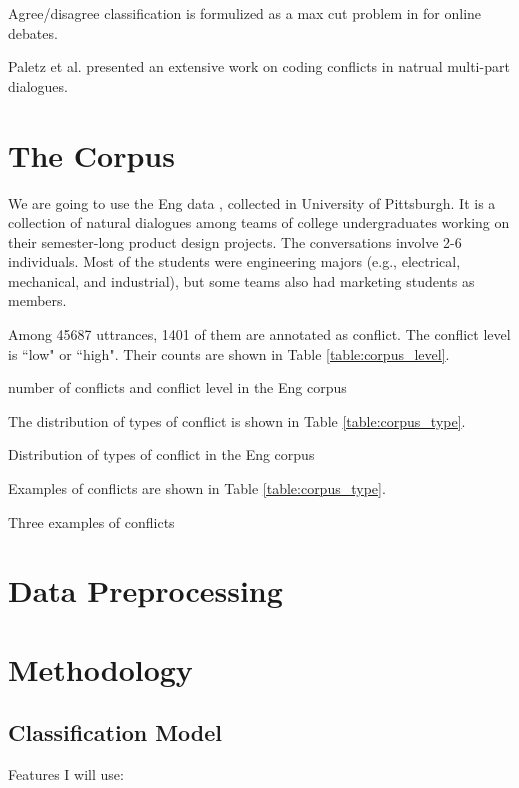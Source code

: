 \documentclass[11pt,letterpaper]{article}
\begin{document}
Agree/disagree classification is formulized as a max cut problem in \cite{Murakami:2010} for online debates.

Paletz et al.  presented an extensive work on coding conflicts in natrual multi-part dialogues.

\section{The Corpus}
We are going to use the Eng data \cite{Jang:2012,Friedberg:2012}, collected in University of Pittsburgh.
It is a collection of natural dialogues among teams of college undergraduates working on their semester-long product design projects.
The conversations involve 2-6 individuals. Most of the students were engineering majors (e.g., electrical, mechanical, and industrial), but some teams also had marketing students as members.

Among 45687 uttrances, 1401 of them are annotated as conflict. The conflict level is ``low" or ``high". Their counts are shown in Table \ref{table:corpus_level}.
\begin{table}[!htb] 
\centering

\caption{number of conflicts and conflict level in the Eng corpus}
\label{table:corpus_level}
\end{table}

The distribution of types of conflict is shown in Table \ref{table:corpus_type}.
\begin{table*}[!htb] 
\centering

\caption{Distribution of types of conflict in the Eng corpus}
\label{table:corpus_type}
\end{table*}

Examples of conflicts are shown in Table \ref{table:corpus_type}.
\begin{table*}[!htb] 
\centering

\caption{Three examples of conflicts}
\label{table:corpus_examples}
\end{table*}

\section{Data Preprocessing}

\section{Methodology}

\subsection{Classification Model}
Features I will use:
\end{document}
